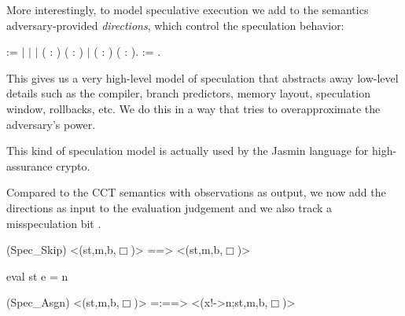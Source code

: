 \documentclass[12pt]{report}
\begin{document}
 More interestingly, to model speculative execution we add to the semantics
    adversary-provided \textit{directions}, which control the speculation behavior: 
\begin{coqdoccode}
\coqdocemptyline
\coqdocnoindent
{}  :=\coqdoceol
\coqdocnoindent
\ensuremath{|}   \coqdoceol
\coqdocnoindent
\ensuremath{|}  \coqdoceol
\coqdocnoindent
\ensuremath{|}  ( : ) ( : )   \coqdoceol
\coqdocnoindent
\ensuremath{|}  ( : ) ( : ). \coqdocemptyline
\coqdocnoindent
{}  :=  .\coqdoceol
\coqdocemptyline
\end{coqdoccode}
This gives us a very high-level model of speculation that abstracts away
    low-level details such as the compiler, branch predictors, memory layout,
    speculation window, rollbacks, etc. We do this in a way that tries to
    overapproximate the adversary's power.


    This kind of speculation model is actually used by the Jasmin language for
    high-assurance crypto. 

 Compared to the CCT semantics with observations as output, we now add the
    directions as input to the evaluation judgement and we also track a
    misspeculation bit . 

\par
\noindent\hrulefill\par
\noindent{} (Spec\_Skip)
  <(st,m,b,\ensuremath{\Box})> ==> <(st,m,b,\ensuremath{\Box})>


                 eval st e = n
\par
\noindent\hrulefill\par
\noindent{} (Spec\_Asgn)
   <(st,m,b,\ensuremath{\Box})> =:==> <(x!->n;st,m,b,\ensuremath{\Box})>
\end{document}
